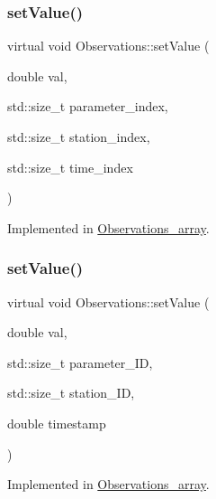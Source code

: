 \subsubsection{\texorpdfstring{set\+Value()}{setValue()}\hspace{0.1cm}{\footnotesize\ttfamily [1/2]}}
{\footnotesize\ttfamily virtual void Observations\+::set\+Value (\begin{DoxyParamCaption}\item[{double}]{val,  }\item[{std\+::size\+\_\+t}]{parameter\+\_\+index,  }\item[{std\+::size\+\_\+t}]{station\+\_\+index,  }\item[{std\+::size\+\_\+t}]{time\+\_\+index }\end{DoxyParamCaption})\hspace{0.3cm}{\ttfamily [pure virtual]}}



Implemented in \mbox{\hyperlink{class_observations__array_aa6b6e042f8db0afad3beaff248b4a602}{Observations\+\_\+array}}.

\mbox{\label{class_observations_a6ec8166ad0f141e23a07847ab3646a61}} 
\subsubsection{\texorpdfstring{set\+Value()}{setValue()}\hspace{0.1cm}{\footnotesize\ttfamily [2/2]}}
{\footnotesize\ttfamily virtual void Observations\+::set\+Value (\begin{DoxyParamCaption}\item[{double}]{val,  }\item[{std\+::size\+\_\+t}]{parameter\+\_\+\+ID,  }\item[{std\+::size\+\_\+t}]{station\+\_\+\+ID,  }\item[{double}]{timestamp }\end{DoxyParamCaption})\hspace{0.3cm}{\ttfamily [pure virtual]}}



Implemented in \mbox{\hyperlink{class_observations__array_a3994f0e11a8207c5e1182a9b20a67ec4}{Observations\+\_\+array}}.

\mbox{\label{class_observations_a3aaf49cad714ff61c105d26b4b083ac3}} 
